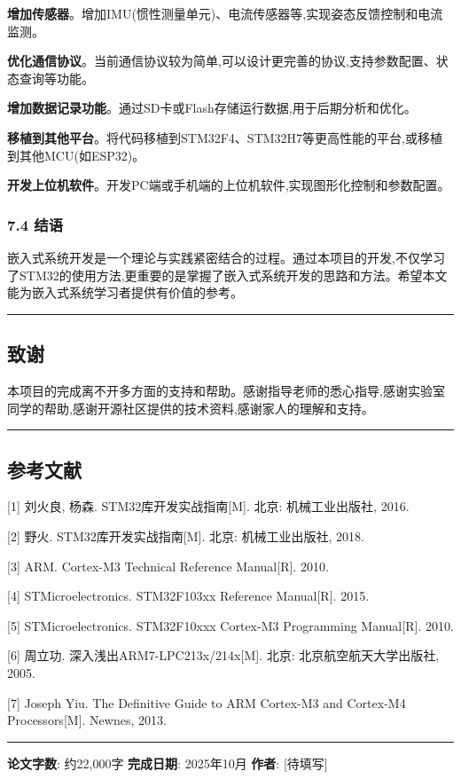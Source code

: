 \documentclass[
]{article}
\begin{document}
\textbf{增加传感器}。增加IMU(惯性测量单元)、电流传感器等,实现姿态反馈控制和电流监测。

\textbf{优化通信协议}。当前通信协议较为简单,可以设计更完善的协议,支持参数配置、状态查询等功能。

\textbf{增加数据记录功能}。通过SD卡或Flash存储运行数据,用于后期分析和优化。

\textbf{移植到其他平台}。将代码移植到STM32F4、STM32H7等更高性能的平台,或移植到其他MCU(如ESP32)。

\textbf{开发上位机软件}。开发PC端或手机端的上位机软件,实现图形化控制和参数配置。

\hypertarget{ux7ed3ux8bed}{%
\subsubsection{7.4 结语}\label{ux7ed3ux8bed}}

嵌入式系统开发是一个理论与实践紧密结合的过程。通过本项目的开发,不仅学习了STM32的使用方法,更重要的是掌握了嵌入式系统开发的思路和方法。希望本文能为嵌入式系统学习者提供有价值的参考。

\begin{center}\rule{0.5\linewidth}{0.5pt}\end{center}

\hypertarget{ux81f4ux8c22}{%
\subsection{致谢}\label{ux81f4ux8c22}}

本项目的完成离不开多方面的支持和帮助。感谢指导老师的悉心指导,感谢实验室同学的帮助,感谢开源社区提供的技术资料,感谢家人的理解和支持。

\begin{center}\rule{0.5\linewidth}{0.5pt}\end{center}

\hypertarget{ux53c2ux8003ux6587ux732e}{%
\subsection{参考文献}\label{ux53c2ux8003ux6587ux732e}}

{[}1{]} 刘火良, 杨森. STM32库开发实战指南{[}M{]}. 北京: 机械工业出版社,
2016.

{[}2{]} 野火. STM32库开发实战指南{[}M{]}. 北京: 机械工业出版社, 2018.

{[}3{]} ARM. Cortex-M3 Technical Reference Manual{[}R{]}. 2010.

{[}4{]} STMicroelectronics. STM32F103xx Reference Manual{[}R{]}. 2015.

{[}5{]} STMicroelectronics. STM32F10xxx Cortex-M3 Programming
Manual{[}R{]}. 2010.

{[}6{]} 周立功. 深入浅出ARM7-LPC213x/214x{[}M{]}. 北京:
北京航空航天大学出版社, 2005.

{[}7{]} Joseph Yiu. The Definitive Guide to ARM Cortex-M3 and Cortex-M4
Processors{[}M{]}. Newnes, 2013.

\begin{center}\rule{0.5\linewidth}{0.5pt}\end{center}

\textbf{论文字数}: 约22,000字 \textbf{完成日期}: 2025年10月
\textbf{作者}: {[}待填写{]}
\end{document}
